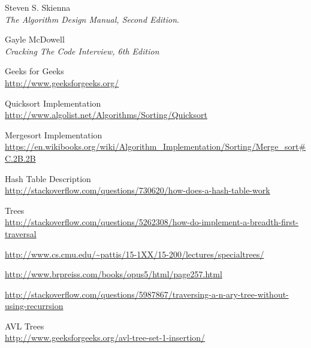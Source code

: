 \documentclass [12pt, executivepaper]{article}
\begin{document}
\begin{center}

\begin{thebibliography}{9}
 
Steven S. Skienna \\
\textit{The Algorithm Design Manual, Second Edition}. 

Gayle McDowell \\
\textit{Cracking The Code Interview, 6th Edition}
 
Geeks for Geeks \\
\url{http://www.geeksforgeeks.org/}

Quicksort Implementation \\
\url{http://www.algolist.net/Algorithms/Sorting/Quicksort}

Mergesort Implementation \\
\url{https://en.wikibooks.org/wiki/Algorithm_Implementation/Sorting/Merge_sort#C.2B.2B}

Hash Table Description \\
\url{http://stackoverflow.com/questions/730620/how-does-a-hash-table-work}

Trees \\
\url{http://stackoverflow.com/questions/5262308/how-do-implement-a-breadth-first-traversal}

\vspace{1mm}

\url{http://www.cs.cmu.edu/~pattis/15-1XX/15-200/lectures/specialtrees/}

\vspace{1mm}

\url{http://www.brpreiss.com/books/opus5/html/page257.html}

\vspace{1mm}

\url{http://stackoverflow.com/questions/5987867/traversing-a-n-ary-tree-without-using-recurrsion}

AVL Trees \\
\url{http://www.geeksforgeeks.org/avl-tree-set-1-insertion/}

\vspace{1mm}


\end{thebibliography}
\end{center}
\end{document}
